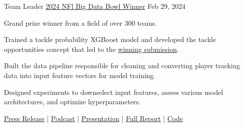 

\begin{cventries}
    
\cventry
{Team Leader} %
{\href{https://operations.nfl.com/gameday/analytics/big-data-bowl/2024-big-data-bowl-winner-and-finalists/}{2024 NFl Big Data Bowl Winner}}
{} %
{Feb 29, 2024} %
{
  \begin{cvitems} %
    \item {Grand prize winner from a field of over 300 teams.}
    \item {Trained a tackle probability XGBoost model and developed the tackle opportunities concept that led to the \href{https://www.kaggle.com/code/matthewpchang/uncovering-missed-tackle-opportunities}{winning submission}.}
    \item {Built the data pipeline responsible for cleaning and converting player tracking data into input feature vectors for model training.}
    \item {Designed experiments to downselect input features, assess various model architectures, and optimize hyperparameters.}
    \item {\href{https://operations.nfl.com/gameday/analytics/big-data-bowl/2024-big-data-bowl-winner-and-finalists/}{Press Release} | \href{https://www.trumedianetworks.com/expected-value-podcast/2024/3/12/matt-chang-nfl-big-data-bowl-winner}{Podcast} | \href{https://www.loom.com/share/54c67d584ee34efbb799e8dbbd551091}{Presentation} | \href{https://www.kaggle.com/code/matthewpchang/uncovering-missed-tackle-opportunities}{Full Report} | \href{https://github.com/mpchang/uncovering-missed-tackle-opportunities}{Code}}
  \end{cvitems}
}

\end{cventries}
